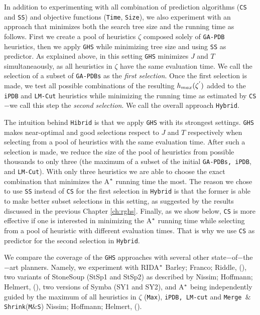 In addition to experimenting with all combination of prediction algorithms (\texttt{CS} and \texttt{SS}) and objective functions (\texttt{Time}, \texttt{Size}), we also experiment with an approach that minimizes both the search tree size and the running time as follows. First we create a pool of heuristics $\zeta$ composed solely of \texttt{GA-PDB} heuristics, then we apply \texttt{GHS} while minimizing tree size and using \texttt{SS} as predictor. As explained above, in this setting \texttt{GHS} minimizes $J$ and $T$ simultaneaously, as all heuristics in $\zeta$ have the same evaluation time. We call the selection of a subset of \texttt{GA-PDBs} as the \textit{first selection}. Once the first selection is made, we test all possible combinations of the resulting $h_{max}(\zeta\sp{'})$ added to the \texttt{iPDB} and \texttt{LM-Cut} heuristics while minimizing the running time as estimated by \texttt{CS}$-$we call this step the \textit{second selection}. We call the overall approach \texttt{Hybrid}.

The intuition behind \texttt{Hibrid} is that we apply \texttt{GHS} with its strongest settings. \texttt{GHS} makes near-optimal and good selections respect to $J$ and $T$ respectively when selecting from a pool of heuristics with the same evaluation time. After such a selection is made, we reduce the size of the pool of heuristics from possible thousands to only three (the maximum of a subset of the initial \texttt{GA-PDBs, iPDB}, and \texttt{LM-Cut}). With only three heuristics we are able to choose the exact combination that minimizes the A$\sp{*}$ running time the most. The reason we chose to use \texttt{SS} instead of \texttt{CS} for the first selection in \texttt{Hybrid} is that the former is able to make better subset selections in this setting, as suggested by the results discussed in the previous Chapter \ref{ch:rghs}. Finally, as we show below, \texttt{CS} is more effective if one is interested in minimizing the A$\sp{*}$ running time while selecting from a pool of heuristic with different evaluation times. That is why we use \texttt{CS} as predictor for the second selection in \texttt{Hybrid}.

We compare the coverage of the \texttt{GHS} approaches with several other state$-$of$-$the$-$art planners. Namely, we experiment with RIDA$\sp{*}$ Barley; Franco; Riddle, (\citeyear{BarleySantiagoOver}), two variants of StoneSoup (StSp1 and StSp2) as described by Nissim; Hoffmann; Helmert,  (\citeyear{nissim2011computing}), two versions of Symba (SY1 and SY2), and A$\sp{*}$ being independently guided by the maximum of all heuristics in $\zeta$ (\texttt{Max}), \texttt{iPDB, LM-cut} and \texttt{Merge $\&$ Shrink}(\texttt{M$\&$S}) Nissim; Hoffmann; Helmert, (\citeyear{nissim2011computing}).

